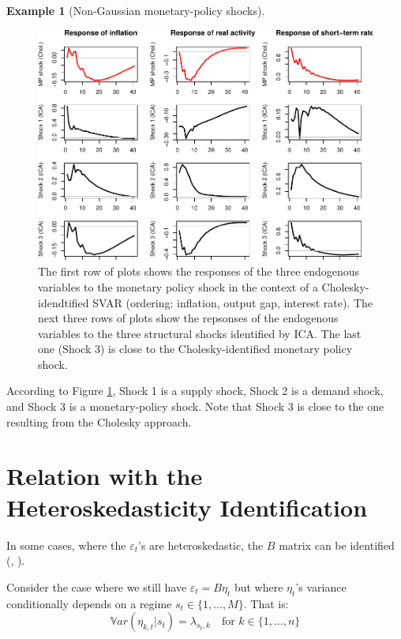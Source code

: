 \documentclass[
  12pt,
]{book}
\theoremstyle{definition}
\theoremstyle{definition}
\newtheorem{example}{Example}[chapter]
\theoremstyle{definition}
\theoremstyle{definition}
\theoremstyle{remark}
\begin{document}
\begin{example}[Non-Gaussian monetary-policy shocks]
\begin{figure}
\includegraphics[width=0.95\linewidth]{IdentifStructShocks_files/figure-latex/ICAFigIRF-1} \caption{The first row of plots shows the responses of the three endogenous variables to the monetary policy shock in the context of a Cholesky-idendtified SVAR (ordering: inflation, output gap, interest rate). The next three rows of plots show the repsonses of the endogenous variables to the three structural shocks identified by ICA. The last one (Shock 3) is close to the Cholesky-identified monetary policy shock.}\label{fig:ICAFigIRF}
\end{figure}

According to Figure \ref{fig:ICAFigIRF}, Shock 1 is a supply shock, Shock 2 is a demand shock, and Shock 3 is a monetary-policy shock. Note that Shock 3 is close to the one resulting from the Cholesky approach.
\end{example}

\hypertarget{relation-with-the-heteroskedasticity-identification}{%
\section{Relation with the Heteroskedasticity Identification}\label{relation-with-the-heteroskedasticity-identification}}

In some cases, where the \(\varepsilon_t\)'s are heteroskedastic, the \(B\) matrix can be identified (\citet{Rigobon_2003}, \citet{LANNE2010121}).

Consider the case where we still have \(\varepsilon_t = B \eta_t\) but where \(\eta_t\)'s variance conditionally depends on a regime \(s_t \in \{1,\dots,M\}\). That is:
\[
\mathbb{V}ar(\eta_{k,t}|s_t) = \lambda_{s_t,k} \quad \mbox{for } k \in \{1,\dots,n\}
\]
\end{document}
